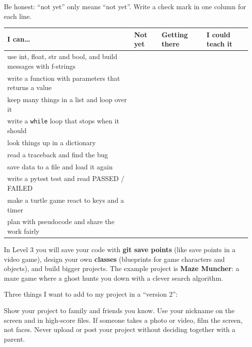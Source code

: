 \begin{exercise}
Be honest: \enquote{not yet} only means \enquote{not yet}. Write a check mark in one column for each line.

\renewcommand{\arraystretch}{1.45}
\begin{tabularx}{\linewidth}{|X|p{1.7cm}|p{1.9cm}|p{1.9cm}|}
\hline
\textbf{I can…} & \textbf{Not yet} & \textbf{Getting there} & \textbf{I could teach it} \\ \hline
use int, float, str and bool, and build messages with f-strings & & & \\ \hline
write a function with parameters that returns a value & & & \\ \hline
keep many things in a list and loop over it & & & \\ \hline
write a \texttt{while} loop that stops when it should & & & \\ \hline
look things up in a dictionary & & & \\ \hline
read a traceback and find the bug & & & \\ \hline
save data to a file and load it again & & & \\ \hline
write a pytest test and read PASSED / FAILED & & & \\ \hline
make a turtle game react to keys and a timer & & & \\ \hline
plan with pseudocode and share the work fairly & & & \\ \hline
\end{tabularx}
\end{exercise}

\begin{exercise}
In Level 3 you will save your code with \textbf{git save points} (like save points in a video game),
design your own \textbf{classes} (blueprints for game characters and objects), and build bigger
projects. The example project is \textbf{Maze Muncher}: a maze game where a ghost hunts you down with a
clever search algorithm.

Three things I want to add to my project in a \enquote{version 2}:
\end{exercise}

\begin{safety}
Show your project to family and friends you know. Use your nickname on the screen and in high-score
files. If someone takes a photo or video, film the screen, not faces. Never upload or post your
project without deciding together with a parent.
\end{safety}

